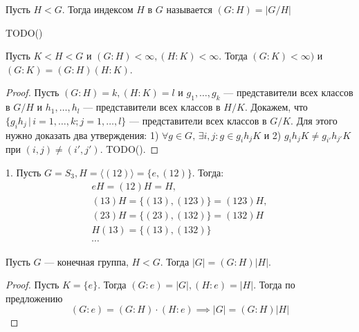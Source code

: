 \documentclass[../main.tex]{subfiles}
\begin{document}
\begin{definition}
    Пусть $H < G$. Тогда индексом $H$ в $G$ называется $(G : H) = |G / H|$
\end{definition}

TODO()

\begin{theorem-non}
    Пусть $K < H < G$ и $(G : H) < \infty, (H : K) < \infty$. Тогда $(G : K) < \infty)$ и $(G : K) = (G : H)(H : K)$.
\end{theorem-non}
\begin{proof}
    Пусть $(G : H) = k, (H : K) = l$ и $g_1, \dotsc, g_k$ --- представители всех классов в $G / H$ и $h_1, \dotsc, h_l$ --- представители всех классов в $H / K$. Докажем, что $\{g_i h_j \, | \, i = 1,\dotsc,k; j = 1,\dotsc, l\}$ --- представители всех классов в $G / K$. Для этого нужно доказать два утверждения: 1) $\forall g \in G, \, \exists i, j\colon g \in g_i h_j K$ и 2) $g_i h_j K \neq g_{i'} h_{j'} K$ при $(i, j) \neq (i', j')$. TODO().
\end{proof}

\begin{examples}
    1. Пусть $G = S_3, H = \langle (1 2) \rangle = \{e, (1 2)\}$. Тогда:
    \begin{equation*}
        \begin{gathered}
            eH = (1 2)H = H,\\
            (1 3)H = \{(1 3), (1 2 3)\} = (1 2 3)H,\\
            (2 3)H = \{(2 3), (1 3 2)\} = (1 3 2)H\\
            H(1 3) = \{(1 3), (1 3 2)\}\\
            \cdots
        \end{gathered}
    \end{equation*}
\end{examples}

\begin{corollary*}
    Пусть $G$ --- конечная группа, $H < G$. Тогда $|G| = (G : H)|H|$.
\end{corollary*}
\begin{proof}
    Пусть $K = \{e\}$. Тогда $(G : e) = |G|, (H : e) = |H|$. Тогда по предложению
    \begin{equation*}
        (G : e) = (G : H) \cdot (H : e) \implies |G| = (G : H)|H|
    \end{equation*}
\end{proof}
\end{document}
